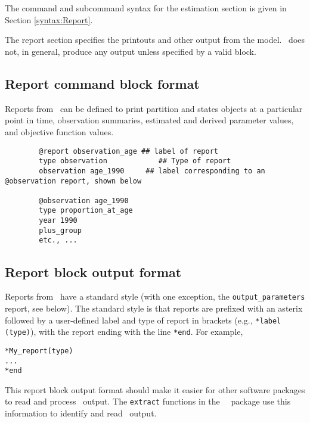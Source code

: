 \section{\label{sec:Report}}

The command and subcommand syntax for the estimation section is given in Section \ref{syntax:Report}.

The report section specifies the printouts and other output from the model. \CNAME\ does not, in general, produce any output unless specified by a valid  block.

\subsection{Report command block format}

Reports from \CNAME\ can be defined to print partition and states objects at a particular point in time, observation summaries, estimated and derived parameter values, and objective function values.

\begin{verbatim}
		@report observation_age ## label of report
		type observation		    ## Type of report
		observation age_1990	 ## label corresponding to an @observation report, shown below

		@observation age_1990
		type proportion_at_age
		year 1990
		plus_group
		etc., ...
\end{verbatim}

\subsection{Report block output format}

Reports from \CNAME\ have a standard style (with one exception, the \texttt{output\_parameters} report, see below). The standard style is that reports are prefixed with an asterix followed by a user-defined label and type of report in brackets (e.g., \texttt{*label (type)}), with the report ending with the line \texttt{*end}. For example,

\begin{verbatim}
*My_report(type)
...
*end
\end{verbatim}

This report block output format should make it easier for other software packages to read and process \CNAME\ output. The \texttt{extract} functions in the \R\ \CNAME\ package use this information to identify and read \CNAME\ output.

